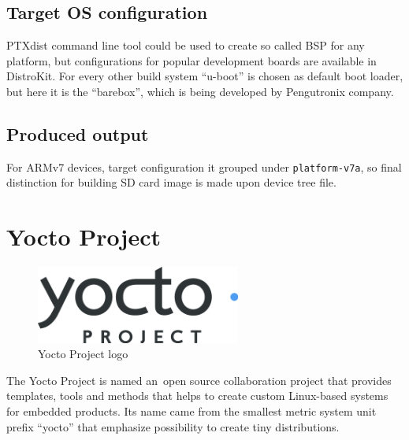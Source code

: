 \documentclass[printmode]{mgr}
\begin{document}
\subsection*{Target OS configuration}

PTXdist command line tool could be used to create so called BSP for any platform, but configurations for popular development boards are available in DistroKit.
For every other build system ``u-boot'' is chosen as default boot loader, but here it is the ``barebox'', which is being developed by Pengutronix company.

\subsection*{Produced output}

For ARMv7 devices, target configuration it grouped under \verb|platform-v7a|, so final distinction for building SD card image is made upon device tree file.





\section{Yocto Project}

\begin{figure}[htbp]
  \centering
    \includegraphics[width=0.6\textwidth]{yoctoproject-logo.png}
    \caption{Yocto Project logo}
  \label{fig:yoctoproject-logo}
\end{figure}

The Yocto Project is named an~open source collaboration project that provides templates, tools and methods that helps to create custom Linux-based systems for embedded products. Its name came from the smallest metric system unit prefix ``yocto'' that emphasize possibility to create tiny distributions.
\end{document}
